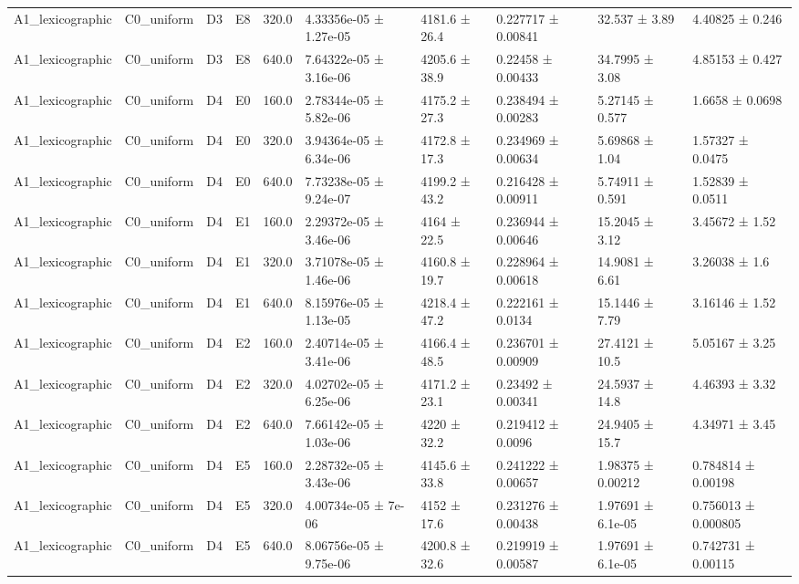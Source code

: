 \begin{table}
\begin{tabular}{llllllllll}
A1\_lexicographic & C0\_uniform & D3 & E8 & 320.0 & 4.33356e-05 ± 1.27e-05 & 4181.6 ± 26.4 & 0.227717 ± 0.00841 & 32.537 ± 3.89 & 4.40825 ± 0.246 \\
A1\_lexicographic & C0\_uniform & D3 & E8 & 640.0 & 7.64322e-05 ± 3.16e-06 & 4205.6 ± 38.9 & 0.22458 ± 0.00433 & 34.7995 ± 3.08 & 4.85153 ± 0.427 \\
A1\_lexicographic & C0\_uniform & D4 & E0 & 160.0 & 2.78344e-05 ± 5.82e-06 & 4175.2 ± 27.3 & 0.238494 ± 0.00283 & 5.27145 ± 0.577 & 1.6658 ± 0.0698 \\
A1\_lexicographic & C0\_uniform & D4 & E0 & 320.0 & 3.94364e-05 ± 6.34e-06 & 4172.8 ± 17.3 & 0.234969 ± 0.00634 & 5.69868 ± 1.04 & 1.57327 ± 0.0475 \\
A1\_lexicographic & C0\_uniform & D4 & E0 & 640.0 & 7.73238e-05 ± 9.24e-07 & 4199.2 ± 43.2 & 0.216428 ± 0.00911 & 5.74911 ± 0.591 & 1.52839 ± 0.0511 \\
A1\_lexicographic & C0\_uniform & D4 & E1 & 160.0 & 2.29372e-05 ± 3.46e-06 & 4164 ± 22.5 & 0.236944 ± 0.00646 & 15.2045 ± 3.12 & 3.45672 ± 1.52 \\
A1\_lexicographic & C0\_uniform & D4 & E1 & 320.0 & 3.71078e-05 ± 1.46e-06 & 4160.8 ± 19.7 & 0.228964 ± 0.00618 & 14.9081 ± 6.61 & 3.26038 ± 1.6 \\
A1\_lexicographic & C0\_uniform & D4 & E1 & 640.0 & 8.15976e-05 ± 1.13e-05 & 4218.4 ± 47.2 & 0.222161 ± 0.0134 & 15.1446 ± 7.79 & 3.16146 ± 1.52 \\
A1\_lexicographic & C0\_uniform & D4 & E2 & 160.0 & 2.40714e-05 ± 3.41e-06 & 4166.4 ± 48.5 & 0.236701 ± 0.00909 & 27.4121 ± 10.5 & 5.05167 ± 3.25 \\
A1\_lexicographic & C0\_uniform & D4 & E2 & 320.0 & 4.02702e-05 ± 6.25e-06 & 4171.2 ± 23.1 & 0.23492 ± 0.00341 & 24.5937 ± 14.8 & 4.46393 ± 3.32 \\
A1\_lexicographic & C0\_uniform & D4 & E2 & 640.0 & 7.66142e-05 ± 1.03e-06 & 4220 ± 32.2 & 0.219412 ± 0.0096 & 24.9405 ± 15.7 & 4.34971 ± 3.45 \\
A1\_lexicographic & C0\_uniform & D4 & E5 & 160.0 & 2.28732e-05 ± 3.43e-06 & 4145.6 ± 33.8 & 0.241222 ± 0.00657 & 1.98375 ± 0.00212 & 0.784814 ± 0.00198 \\
A1\_lexicographic & C0\_uniform & D4 & E5 & 320.0 & 4.00734e-05 ± 7e-06 & 4152 ± 17.6 & 0.231276 ± 0.00438 & 1.97691 ± 6.1e-05 & 0.756013 ± 0.000805 \\
A1\_lexicographic & C0\_uniform & D4 & E5 & 640.0 & 8.06756e-05 ± 9.75e-06 & 4200.8 ± 32.6 & 0.219919 ± 0.00587 & 1.97691 ± 6.1e-05 & 0.742731 ± 0.00115 \\

\end{tabular}
\end{table}
